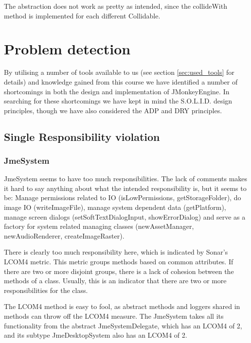 \documentclass[a4paper, 10pt]{article}
\begin{document}
The abstraction does not work as pretty as intended,
since the collideWith method is implemented
for each different Collidable.


\section{Problem detection}
\label{sec:problem_detection}

By utilising a number of tools available to us (see section
\ref{sec:used_tools} for details) and knowledge gained from this
course we have identified a number of shortcomings in both the design
and implementation of JMonkeyEngine. In searching for these
shortcomings we have kept in mind the  S.O.L.I.D. design principles,
though we have also considered the ADP and DRY principles.


\subsection{Single Responsibility violation}
\label{sec:srp_violation}
\subsubsection{JmeSystem}
JmeSystem seems to have too much responsibilities.
The lack of comments makes it hard to say anything about what 
the intended responsibility is, but it seems to be:
Manage permissions related to IO 
(isLowPermissions, getStorageFolder),
do image IO (writeImageFile),
manage system dependent data (getPlatform),
manage screen dialogs 
(setSoftTextDialogInput, showErrorDialog) and
serve as a factory for system related managing classes 
(newAssetManager, newAudioRenderer, createImageRaster).

There is clearly too much responsibility here, 
which is indicated by Sonar's LCOM4 metric.
This metric groups methods based on common attributes.
If there are two or more disjoint groups, 
there is a lack of cohesion between the methods of a class.
Usually, this is an indicator that there are two or more 
responsibilities for the class.

The LCOM4 method is easy to fool, as
abstract methods and loggers shared in methods can throw off
the LCOM4 measure.
The JmeSystem takes all its functionality 
from the abstract JmeSystemDelegate, 
which has an LCOM4 of 2,
and its subtype JmeDesktopSystem also has an LCOM4 of 2.
\end{document}
